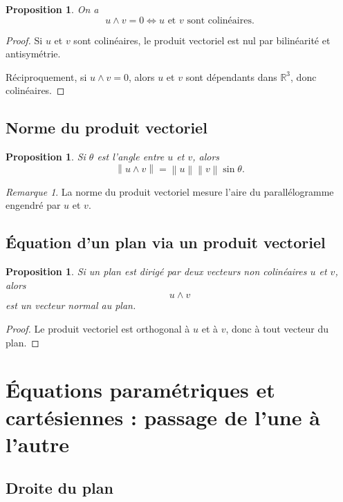 \documentclass[11pt,a4paper]{article}
\newtheorem{proposition}[definition]{Proposition}
\theoremstyle{remark}
\newtheorem{remarque}[definition]{Remarque}
\newcommand{\R}{\mathbb{R}}
\newcommand{\Norm}[1]{\left\|#1\right\|}
\begin{document}
\begin{proposition}
On a
\[
u\wedge v=0
\Longleftrightarrow
u \text{ et } v \text{ sont colinéaires.}
\]
\end{proposition}

\begin{proof}
Si \(u\) et \(v\) sont colinéaires, le produit vectoriel est nul par bilinéarité et antisymétrie.

Réciproquement, si \(u\wedge v=0\), alors \(u\) et \(v\) sont dépendants dans \(\R^3\), donc colinéaires.
\end{proof}

\subsection{Norme du produit vectoriel}

\begin{proposition}
Si \(\theta\) est l’angle entre \(u\) et \(v\), alors
\[
\Norm{u\wedge v}=\Norm{u}\Norm{v}\sin\theta.
\]
\end{proposition}

\begin{remarque}
La norme du produit vectoriel mesure l’aire du parallélogramme engendré par \(u\) et \(v\).
\end{remarque}

\subsection{Équation d’un plan via un produit vectoriel}

\begin{proposition}
Si un plan est dirigé par deux vecteurs non colinéaires \(u\) et \(v\), alors
\[
u\wedge v
\]
est un vecteur normal au plan.
\end{proposition}

\begin{proof}
Le produit vectoriel est orthogonal à \(u\) et à \(v\), donc à tout vecteur du plan.
\end{proof}

\section{Équations paramétriques et cartésiennes : passage de l’une à l’autre}

\subsection{Droite du plan}
\end{document}
